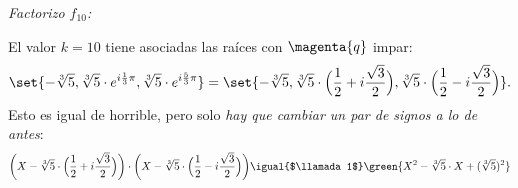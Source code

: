 \bigskip

\textit{Factorizo $f_{\scriptscriptstyle 10}$:}

El valor $k = 10$ tiene asociadas las raíces con $\magenta{q}$ impar:
$$
  \set{-\sqrt[3]{5}, \sqrt[3]{5} \cdot e^{i\frac{1}{3}\pi}, \sqrt[3]{5} \cdot e^{i\frac{5}{3}\pi} } =
  \set{-\sqrt[3]{5}, \sqrt[3]{5} \cdot \Big( \frac{1}{2} + i\frac{\sqrt{3}}{2} \Big), \sqrt[3]{5} \cdot \Big( \frac{1}{2} - i\frac{\sqrt{3}}{2} \Big) }.
$$
Esto es igual de horrible, pero solo \textit{hay que cambiar un par de signos a lo de antes}:
$$
  \bigg(X - \sqrt[3]{5} \cdot \Big( \frac{1}{2} + i\frac{\sqrt{3}}{2}\Big)\bigg)
  \cdot
  \bigg(X - \sqrt[3]{5} \cdot \Big( \frac{1}{2} - i\frac{\sqrt{3}}{2}\Big)\bigg)
  \igual{$\llamada1$}
  \green{X^2  - \sqrt[3]{5} \cdot X + (\sqrt[3]{5})^2}
$$

\begin{aportes}
  \item {}
\end{aportes}
